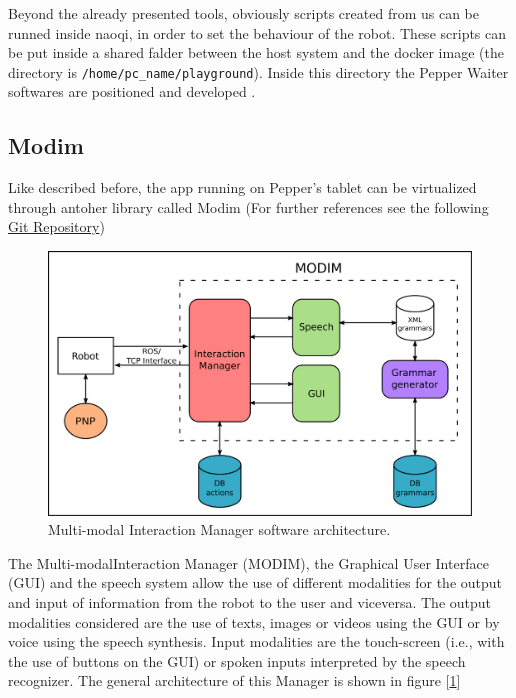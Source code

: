 \documentclass[12pt, letterpaper, twoside]{article}
\begin{document}
Beyond the already presented tools, obviously scripts created from us can be runned inside naoqi, in order to set the behaviour of the robot. These scripts can be put inside a shared falder between the host system and the docker image (the directory is \verb|/home/pc_name/playground|). Inside this directory the Pepper Waiter softwares are positioned and developed .

\subsection{Modim}
Like described before, the app running on Pepper's tablet can be virtualized through antoher library called Modim (For further references see the following \href{https://bitbucket.org/mtlazaro/modim.git}{Git Repository})\\

\begin{figure}[htbp]
	\centerline{\includegraphics[scale=.6]{img/modim.png}}
	\caption{ Multi-modal Interaction Manager software architecture.}
	\label{fig:modim_architecture}
\end{figure}

The Multi-modalInteraction Manager (MODIM), the Graphical User Interface (GUI) and the speech system allow the use of different modalities for the output and input of information from the robot to the user and viceversa. The output modalities considered are the use of texts, images or videos using the GUI or by voice using the speech synthesis. Input modalities are the touch-screen (i.e., with the use of buttons on the GUI) or spoken inputs interpreted by the speech recognizer. The general architecture of this Manager is shown in figure [\ref{fig:modim_architecture}]\\
\end{document}
